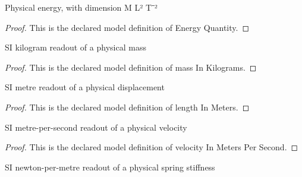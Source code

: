 \begin{definition}
  \label{def:physics:phyx-mini-0226:phyxminiproblems-problemphyxmini0226-energyquantity}
  Physical energy, with dimension M L² T⁻²
\end{definition}
\begin{proof}
  This is the declared model definition of Energy Quantity.
\end{proof}
\begin{definition}
  \label{def:physics:phyx-mini-0226:phyxminiproblems-problemphyxmini0226-massinkilograms}
  SI kilogram readout of a physical mass
\end{definition}
\begin{proof}
  This is the declared model definition of mass In Kilograms.
\end{proof}
\begin{definition}
  \label{def:physics:phyx-mini-0226:phyxminiproblems-problemphyxmini0226-lengthinmeters}
  SI metre readout of a physical displacement
\end{definition}
\begin{proof}
  This is the declared model definition of length In Meters.
\end{proof}
\begin{definition}
  \label{def:physics:phyx-mini-0226:phyxminiproblems-problemphyxmini0226-velocityinmeterspersecond}
  SI metre-per-second readout of a physical velocity
\end{definition}
\begin{proof}
  This is the declared model definition of velocity In Meters Per Second.
\end{proof}
\begin{definition}
  \label{def:physics:phyx-mini-0226:phyxminiproblems-problemphyxmini0226-springconstantinnewtonspermeter}
  SI newton-per-metre readout of a physical spring stiffness
\end{definition}
